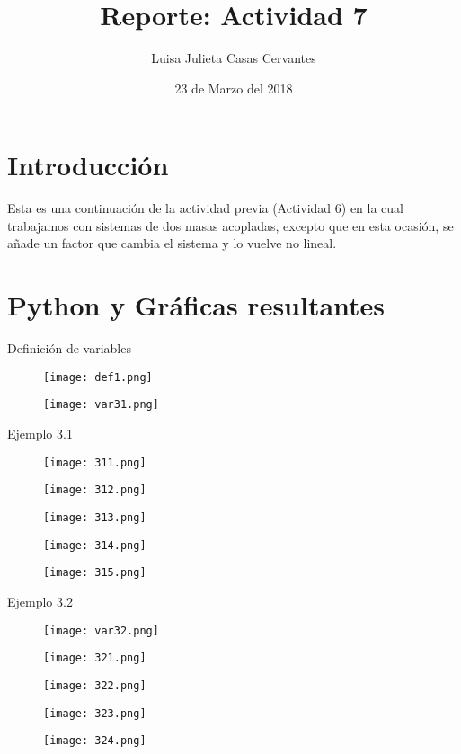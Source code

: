 \documentclass{article}
\title{Reporte: Actividad 7}
\author{Luisa Julieta Casas Cervantes}
\date{23 de Marzo del 2018}
\begin{document}
\maketitle
\section{Introducción}
Esta es una continuación de la actividad previa (Actividad 6) en la cual trabajamos con sistemas de dos masas acopladas, excepto que en esta ocasión, se añade un factor que cambia el sistema y lo vuelve no lineal.
\section{Python y Gráficas resultantes}
Definición de variables
\begin{figure}[H]
\texttt{[image: def1.png]}
\end{figure}
\begin{figure}[H]
\texttt{[image: var31.png]}
\end{figure}
Ejemplo 3.1
\begin{figure}[H]
\texttt{[image: 311.png]}
\end{figure}
\begin{figure}[H]
\texttt{[image: 312.png]}
\end{figure}
\begin{figure}[H]
\texttt{[image: 313.png]}
\end{figure}
\begin{figure}[H]
\texttt{[image: 314.png]}
\end{figure}
\begin{figure}[H]
\texttt{[image: 315.png]}
\end{figure}
Ejemplo 3.2
\begin{figure}[H]
\texttt{[image: var32.png]}
\end{figure}
\begin{figure}[H]
\texttt{[image: 321.png]}
\end{figure}
\begin{figure}[H]
\texttt{[image: 322.png]}
\end{figure}
\begin{figure}[H]
\texttt{[image: 323.png]}
\end{figure}
\begin{figure}[H]
\texttt{[image: 324.png]}
\end{figure}
\end{document}
